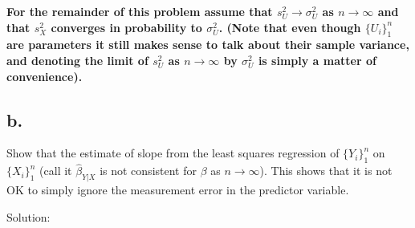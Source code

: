 \documentclass[
  letterpaper,
  DIV=11,
  numbers=noendperiod]{scrreprt}
\begin{document}
\textbf{For the remainder of this problem assume that
\(s_U^2 \to \sigma_U^2\) as \(n \to \infty\) and that \(s_X^2\)
converges in probability to \(\sigma_U^2\). (Note that even though
\(\{U_i\}_1^n\) are parameters it still makes sense to talk about their
sample variance, and denoting the limit of \(s_U^2\) as \(n \to \infty\)
by \(\sigma_U^2\) is simply a matter of convenience).}

\hypertarget{b.-2}{%
\subsection{b.}\label{b.-2}}

Show that the estimate of slope from the least squares regression of
\(\{Y_i\}_1^n\) on \(\{X_i\}_1^n\) (call it \(\hat{\beta}_{Y|X}\) is not
consistent for \(\beta\) as \(n \to \infty\)). This shows that it is not
OK to simply ignore the measurement error in the predictor variable.

Solution:
\end{document}
